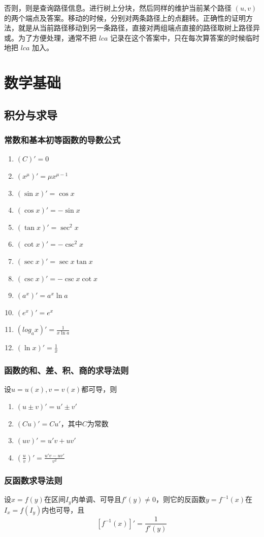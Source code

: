 \documentclass[UTF-8]{ctexart}
\begin{document}
			否则，则是查询路径信息。进行树上分块，然后同样的维护当前某个路径 $(u,v)$ 的两个端点及答案。移动的时候，分别对两条路径上的点翻转。正确性的证明方法，就是从当前路径移动到另一条路径，直接对两组端点直接的路径取树上路径异或。为了方便处理，通常不把 $lca$ 记录在这个答案中，只在每次算答案的时候临时地把 $lca$ 加入。
	\newpage
	\section{数学基础}
		\subsection{积分与求导}
			\subsubsection{常数和基本初等函数的导数公式}
			\begin{enumerate}
				\item $(C)'=0$
				\item $(x^\mu)'=\mu x^{\mu-1}$
				\item $(\sin x)'=\cos x$
				\item $(\cos x)'=-\sin x$
				\item $(\tan x)'=\sec^2 x$
				\item $(\cot x)'=-\csc^2 x$
				\item $(\sec x)'=\sec x \tan x$
				\item $(\csc x)'=-\csc x\cot x$
				\item $(a^x)'=a^x \ln a$
				\item $(e^x)'=e^x$
				\item $(log _ a x)'=\frac{1}{x \ln a}$
				\item $(\ln x)'=\frac{1}{x}$
			\end{enumerate}
			\subsubsection{函数的和、差、积、商的求导法则}
			设$u=u(x),v=v(x)$都可导，则  
			
			\begin{enumerate}
				\item $(u \pm v)'=u' \pm v'$
				\item $(Cu)'=Cu'$，其中$C$为常数
				\item $(uv)'=u'v+uv'$
				\item $(\frac{u}{v})'=\frac{u'v-uv'}{v^2}$
			\end{enumerate}
			\subsubsection{反函数求导法则}
			设$x=f(y)$在区间$I _ y$内单调、可导且$f'(y)\ne 0$，则它的反函数$y=f^{-1}(x)$在$I _ x=f(I _ y)$内也可导，且
			$$[f^{-1}(x)]'=\frac{1}{f'(y)}$$
\end{document}
